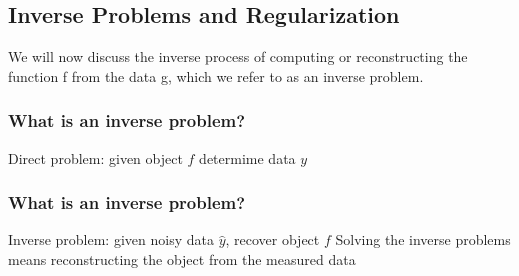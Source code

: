 \documentclass{beamer}
\begin{document}
\subsection{Inverse Problems and Regularization}
\begin{frame}
	\center 
	We will now discuss the inverse process of computing or reconstructing the function f from the data g, which we refer to
as an inverse problem.
\end{frame}
\begin{frame}
	\frametitle{What is an inverse problem?}
\begin{center}
\end{center}
\center
	Direct problem: given object $f$ determime data $y$
\end{frame}
\begin{frame}
	\frametitle{What is an inverse problem?}
\begin{center}

	Inverse problem: given noisy data $ \hat{y}$, recover object $f$
	\newline 
		 \pause
	Solving the inverse problems means reconstructing the object from the measured
data

\end{center}
	
\end{frame}
\end{document}
